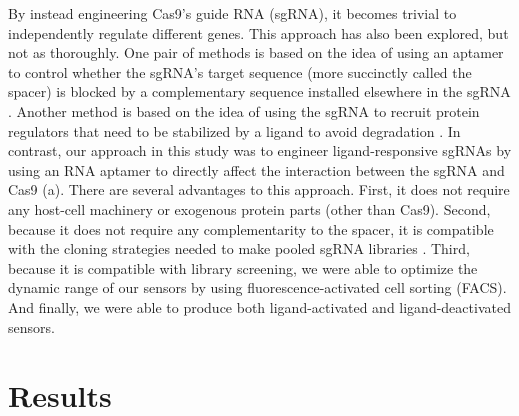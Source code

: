 \documentclass[10pt,oneside]{article}
\begin{document}
% 
% 
% 
%
By instead engineering Cas9's guide RNA (sgRNA), it becomes trivial to independently regulate different genes.  This approach has also been explored, but not as thoroughly.  One pair of methods is based on the idea of using an aptamer to control whether the sgRNA's  target sequence (more succinctly called the spacer) is blocked by a complementary sequence installed elsewhere in the sgRNA \autocite{liu2016,tang2017}.  Another method is based on the idea of using the sgRNA to recruit protein regulators that need to be stabilized by a ligand to avoid degradation \autocite{maji2017}.  In contrast, our approach in this study was to engineer ligand-responsive sgRNAs by using an RNA aptamer to directly affect the interaction between the sgRNA and Cas9 (a).  There are several advantages to this approach.  First, it does not require any host-cell machinery or exogenous protein parts (other than Cas9).  Second, because it does not require any complementarity to the spacer, it is compatible with the cloning strategies needed to make pooled sgRNA libraries \autocite{gilbert2014}.  Third, because it is compatible with library screening, we were able to optimize the dynamic range of our sensors by using fluorescence-activated cell sorting (FACS).  And finally, we were able to produce both ligand-activated and ligand-deactivated sensors.

\section{Results}



\end{document}
